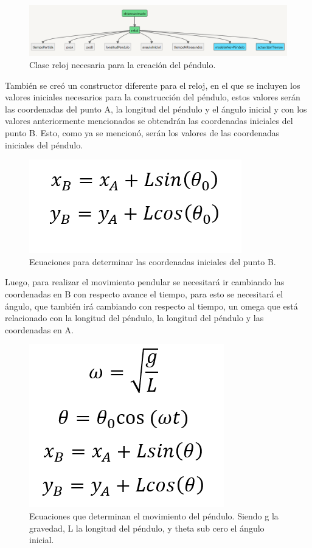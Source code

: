 \documentclass{article}
\begin{document}
\begin{figure}[h]
\includegraphics[scale=0.6]{Images/newreloj.png}
\centering
\caption{Clase reloj necesaria para la creación del péndulo.}
\label{fig:newreloj}
\end{figure}

También se creó un constructor diferente para el reloj, en el que se incluyen los valores iniciales necesarios para la construcción del péndulo, estos valores serán las coordenadas del punto A, la longitud del péndulo y el ángulo inicial y con los valores anteriormente mencionados se obtendrán las coordenadas iniciales del punto B. Esto, como ya se mencionó, serán los valores de las coordenadas iniciales del péndulo.

\begin{figure}[h]
\includegraphics[scale=0.6]{Images/ecuacion1.png}
\centering
\caption{Ecuaciones para determinar las coordenadas iniciales del punto B.}
\label{fig:ecu2}
\end{figure}

Luego, para realizar el movimiento pendular se necesitará ir cambiando las coordenadas en B con respecto avance el tiempo, para esto se necesitará el ángulo, que también irá cambiando con respecto al tiempo, un omega que está relacionado con la longitud del péndulo, la longitud del péndulo y las coordenadas en A.

\begin{figure}[h]
\includegraphics[scale=0.6]{Images/ecuacion2.png}
\centering
\caption{Ecuaciones que determinan el movimiento del péndulo. Siendo g la gravedad, L la longitud del péndulo, y theta sub cero el ángulo inicial.}
\label{fig:ecu1}
\end{figure}
\end{document}
